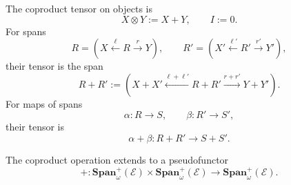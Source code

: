 The coproduct tensor on objects is
\[
  X\otimes Y:=X+Y,
  \qquad
  I:=0.
\]
For spans
\[
  R=
  \left(
    X\xleftarrow{\ell}R\xrightarrow{r}Y
  \right),
  \qquad
  R'=
  \left(
    X'\xleftarrow{\ell'}R'\xrightarrow{r'}Y'
  \right),
\]
their tensor is the span
\[
  R+R'
  :=
  \left(
    X+X'
    \xleftarrow{\ell+\ell'}
    R+R'
    \xrightarrow{r+r'}
    Y+Y'
  \right).
\]
For maps of spans
\[
  \alpha:R\to S,
  \qquad
  \beta:R'\to S',
\]
their tensor is
\[
  \alpha+\beta:R+R'\to S+S'.
\]

\begin{proposition}
\label{prop:coproduct-tensor-pseudofunctor-spans}
The coproduct operation extends to a pseudofunctor
\[
  +:
  \mathbf{Span}^{+}_{\omega}(\mathcal E)
  \times
  \mathbf{Span}^{+}_{\omega}(\mathcal E)
  \longrightarrow
  \mathbf{Span}^{+}_{\omega}(\mathcal E).
\]
\end{proposition}

